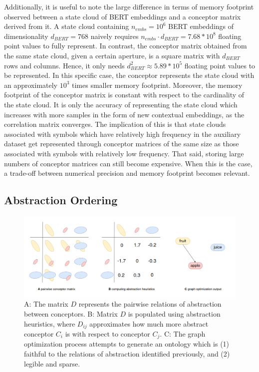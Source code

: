 Additionally, it is useful to note the large difference in terms of memory footprint observed between a state cloud of BERT embeddings and a conceptor matrix derived from it. A state cloud containing $n_{embs} = 10^6$ BERT embeddings of dimensionality $d_{BERT}=768$ naively requires $n_{embs} \cdot d_{BERT} = 7.68 * 10^8$ floating point values to fully represent. In contrast, the conceptor matrix obtained from the same state cloud, given a certain aperture, is a square matrix with $d_{BERT}$ rows and columns. Hence, it only needs $d_{BERT}^2 \approx 5.89 * 10^5$ floating point values to be represented. In this specific case, the conceptor represents the state cloud with an approximately $10^3$ times smaller memory footprint. Moreover, the memory footprint of the conceptor matrix is constant with respect to the cardinality of the state cloud. It is only the accuracy of representing the state cloud which increases with more samples in the form of new contextual embeddings, as the correlation matrix converges. The implication of this is that state clouds associated with symbols which have relatively high frequency in the auxiliary dataset get represented through conceptor matrices of the same size as those associated with symbols with relatively low frequency. That said, storing large numbers of conceptor matrices can still become expensive. When this is the case, a trade-off between numerical precision and memory footprint becomes relevant.

\subsection{Abstraction Ordering}

\begin{figure}[h]
    \centering
    \includegraphics[width=\textwidth]{img/conceptors-graph.png}
    \caption{A: The matrix $D$ represents the pairwise relations of abstraction between conceptors. B: Matrix $D$ is populated using abstraction heuristics, where $D_{ij}$ approximates how much more abstract conceptor $C_i$ is with respect to conceptor $C_j$. C: The graph optimization process attempts to generate an ontology which is (1) faithful to the relations of abstraction identified previously, and (2) legible and sparse.}\label{fig:conceptors-graph}
\end{figure}

